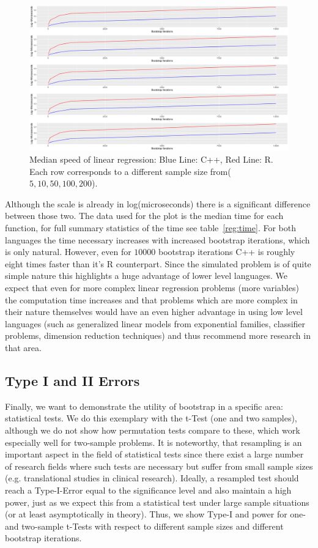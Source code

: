 \begin{figure}\label{fig:regErr}
	\includegraphics[scale=0.3]{./figures/plot_regression.pdf}
	\caption[Regression Complexity]{Median speed of linear regression: Blue Line: C++, Red Line: R. Each row corresponds to a different sample size from($5, 10, 50, 100, 200$).}
\end{figure}

Although the scale is already in log(microseconds) there is a significant difference between those two. The data used for the plot is the median time for each function, for full summary statistics of the time see table~\ref{reg:time}. For both languages the time necessary increases with increased bootstrap iterations, which is only natural. However, even for $10000$ bootstrap iterations C++ is roughly eight times faster than it's R counterpart. Since the simulated problem is of quite simple nature this highlights a huge advantage of lower level languages. We expect that even for more complex linear regression problems (more variables) the computation time increases and that problems which are more complex in their nature themselves would have an even higher advantage in using low level languages (such as generalized linear models from exponential families, classifier problems, dimension reduction techniques) and thus recommend more research in that area.

\subsection{Type I and II Errors}
Finally, we want to demonstrate the utility of bootstrap in a specific area: statistical tests. We do this exemplary with the t-Test (one and two samples), although we do not show how permutation tests compare to these, which work especially well for two-sample problems. It is noteworthy, that resampling is an important aspect in the field of statistical tests since there exist a large number of research fields where such tests are necessary but suffer from small sample sizes (e.g. translational studies in clinical research). Ideally, a resampled test should reach a Type-I-Error equal to the significance level and also maintain a high power, just as we expect this from a statistical test under large sample situations (or at least asymptotically in theory). Thus, we show Type-I and power for one- and two-sample t-Tests with respect to different sample sizes and different bootstrap iterations. 

